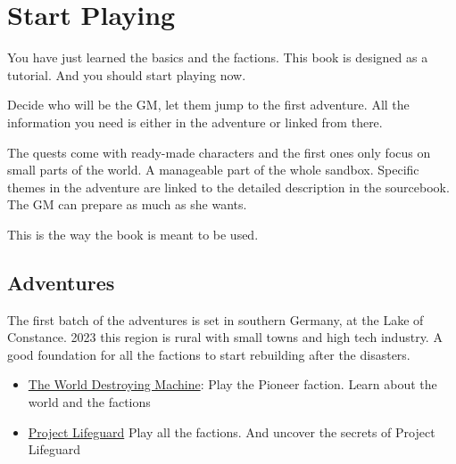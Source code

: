 \chapter{Start Playing}

You have just learned the basics and the factions. This book is designed as a tutorial. And you should start playing now.

Decide who will be the GM, let them jump to the first adventure. All the information you need is either in the adventure or linked from there.

The quests come with ready-made characters and the first ones only focus on small parts of the world. A manageable part of the whole sandbox.
Specific themes in the adventure are linked to the detailed description in the sourcebook. The GM can prepare as much as she wants.

This is the way the book is meant to be used.

\section{Adventures}

The first batch of the adventures is set in southern Germany, at the Lake of Constance. 2023 this region is rural with small towns and high tech industry. A good foundation for all the factions to start rebuilding after the disasters.

\begin{itemize}
\item \hyperref[ch:the world destroying machine]{The World Destroying Machine}: Play the Pioneer faction. Learn about the world and the factions
\item \hyperref[ch:project lifeguard]{Project Lifeguard} Play all the factions. And uncover the secrets of Project Lifeguard
\end{itemize}